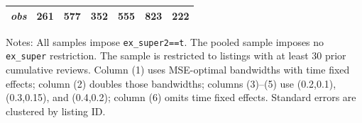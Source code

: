 \begin{table}[!htbp]
\begin{tabular}{lcccccc}
\textit{obs} & 261 & 577 & 352 & 555 & 823 & 222 \\
\bottomrule
\end{tabular}
\begin{minipage}{0.98\textwidth}\footnotesize
Notes: All samples impose \texttt{ex\_super2==t}. The pooled sample imposes no \texttt{ex\_super} restriction. The sample is restricted to listings with at least 30 prior cumulative reviews. Column (1) uses MSE-optimal bandwidths with time fixed effects; column (2) doubles those bandwidths; columns (3)--(5) use (0.2,0.1), (0.3,0.15), and (0.4,0.2); column (6) omits time fixed effects. Standard errors are clustered by listing ID.
\end{minipage}
\end{table}
